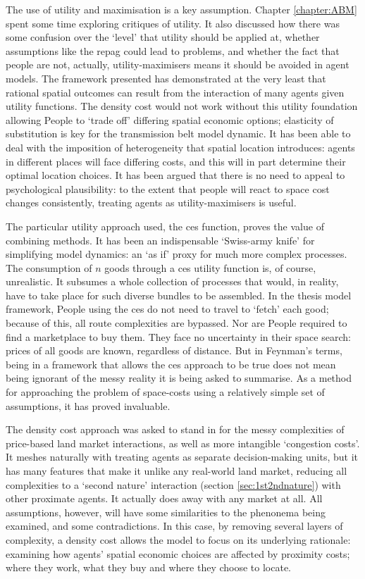 The use of utility and maximisation is a key assumption. Chapter \ref{chapter:ABM} spent some time exploring critiques of utility. It also discussed how there was some confusion over the `level' that utility should be applied at, whether assumptions like the \gls{repag} could lead to problems, and whether the fact that people are not, actually, utility-maximisers means it should be avoided in agent models. The framework presented has demonstrated at the very least that rational spatial outcomes can result from the interaction of many agents given utility functions. The density cost would not work without this utility foundation allowing People to `trade off' differing spatial economic options; elasticity of substitution is key for the transmission belt model dynamic. It has been able to deal with the imposition of heterogeneity that spatial location introduces: agents in different places will face differing costs, and this will in part determine their optimal location choices. It has been argued that there is no need to appeal to psychological plausibility: to the extent that people will react to space cost changes consistently, treating agents as utility-maximisers is useful.

The particular utility approach used, the \gls{ces} function, proves the value of combining methods. It has been an indispensable `Swiss-army knife' for simplifying model dynamics: an `as if' proxy for much more complex processes. The consumption of $n$ goods through a \gls{ces} utility function is, of course, unrealistic. It subsumes a whole collection of processes that would, in reality, have to take place for such diverse bundles to be assembled. In the thesis model framework, People using the \gls{ces} do not need to travel to `fetch' each good; because of this, all route complexities are bypassed. Nor are People required to find a marketplace to buy them. They face no uncertainty in their space search: prices of all goods are known, regardless of distance. But in Feynman's terms, being in a framework that allows the \gls{ces} approach to be true does not mean being ignorant of the messy reality it is being asked to summarise. As a method for approaching the problem of space-costs using a relatively simple set of assumptions, it has proved invaluable.

The density cost approach was asked to stand in for the messy complexities of price-based land market interactions, as well as more intangible `congestion costs'. It meshes naturally with treating agents as separate decision-making units, but it has many features that make it unlike any real-world land market, reducing all complexities to a `second nature' interaction (section \ref{sec:1st2ndnature}) with other proximate agents. It actually does away with any market at all. All assumptions, however, will have some similarities to the phenonema being examined, and some contradictions. In this case, by removing several layers of complexity, a density cost allows the model to focus on its underlying rationale: examining how agents' spatial economic choices are affected by proximity costs; where they work, what they buy and where they choose to locate. 

